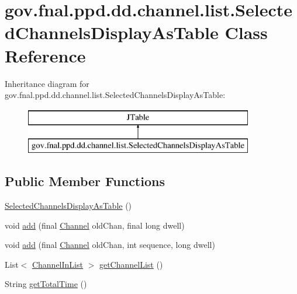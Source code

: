 \hypertarget{classgov_1_1fnal_1_1ppd_1_1dd_1_1channel_1_1list_1_1SelectedChannelsDisplayAsTable}{\section{gov.\-fnal.\-ppd.\-dd.\-channel.\-list.\-Selected\-Channels\-Display\-As\-Table Class Reference}
\label{classgov_1_1fnal_1_1ppd_1_1dd_1_1channel_1_1list_1_1SelectedChannelsDisplayAsTable}
}
Inheritance diagram for gov.\-fnal.\-ppd.\-dd.\-channel.\-list.\-Selected\-Channels\-Display\-As\-Table\-:\begin{figure}[H]
\begin{center}
\leavevmode
\includegraphics[height=2.000000cm]{classgov_1_1fnal_1_1ppd_1_1dd_1_1channel_1_1list_1_1SelectedChannelsDisplayAsTable}
\end{center}
\end{figure}
\subsection*{Public Member Functions}
\begin{DoxyCompactItemize}
\item 
\hyperlink{classgov_1_1fnal_1_1ppd_1_1dd_1_1channel_1_1list_1_1SelectedChannelsDisplayAsTable_a74c25a602d252653e9dd70ac0cef057e}{Selected\-Channels\-Display\-As\-Table} ()
\item 
void \hyperlink{classgov_1_1fnal_1_1ppd_1_1dd_1_1channel_1_1list_1_1SelectedChannelsDisplayAsTable_ab0ffb7d55ba467934f72598f02c87301}{add} (final \hyperlink{interfacegov_1_1fnal_1_1ppd_1_1dd_1_1signage_1_1Channel}{Channel} old\-Chan, final long dwell)
\item 
void \hyperlink{classgov_1_1fnal_1_1ppd_1_1dd_1_1channel_1_1list_1_1SelectedChannelsDisplayAsTable_a26e022a0c56496d6b4a99f51a4cc9526}{add} (final \hyperlink{interfacegov_1_1fnal_1_1ppd_1_1dd_1_1signage_1_1Channel}{Channel} old\-Chan, int sequence, long dwell)
\item 
List$<$ \hyperlink{interfacegov_1_1fnal_1_1ppd_1_1dd_1_1channel_1_1ChannelInList}{Channel\-In\-List} $>$ \hyperlink{classgov_1_1fnal_1_1ppd_1_1dd_1_1channel_1_1list_1_1SelectedChannelsDisplayAsTable_a711f34ff09b13ade321d6cd4e03569bf}{get\-Channel\-List} ()
\item 
String \hyperlink{classgov_1_1fnal_1_1ppd_1_1dd_1_1channel_1_1list_1_1SelectedChannelsDisplayAsTable_ac1880f75ac14d29c4d005aad5212acb3}{get\-Total\-Time} ()
\end{DoxyCompactItemize}


